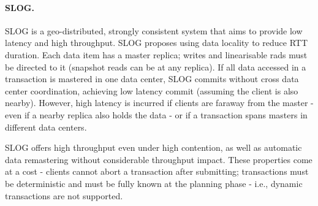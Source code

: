 
\paragraph{SLOG.} SLOG \cite{slog} is a geo-distributed, strongly consistent system that aims to provide low latency and high throughput.
SLOG proposes using data locality to reduce RTT duration.
Each data item has a master replica;
writes and linearisable rads must be directed to it (snapshot reads can be at any replica).
If all data accessed in a transaction is mastered in one data center, 
SLOG commits without cross data center coordination, achieving low latency commit (assuming the client is also nearby).
However, high latency is incurred if clients are faraway from the master - even if a nearby replica also holds the data -  or if a transaction spans masters in different data centers.

SLOG offers high throughput even under high contention,
as well as automatic data remastering without considerable throughput impact.
These properties come at a cost - clients cannot abort a transaction after submitting; transactions must be deterministic and must be fully known at the planning phase - i.e., dynamic transactions are not supported.




